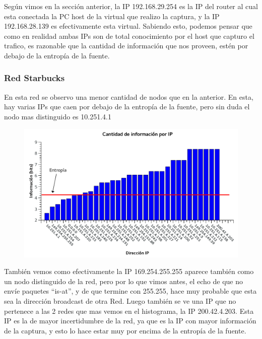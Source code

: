 Según vimos en la sección anterior, la IP 192.168.29.254 es la IP del router al cual esta conectada la PC host de la virtual que realizo la captura, y la IP 192.168.28.139 es efectivamente esta virtual. Sabiendo esto, podemos pensar que como en realidad ambas IPs son de total conocimiento por el host que capturo el trafico, es razonable que la cantidad de información que nos proveen, estén por debajo de la entropía de la fuente.

\FloatBarrier
\subsubsection{Red Starbucks}

En esta red se observo una menor cantidad de nodos que en la anterior. En esta, hay varias IPs que caen por debajo de la entropía de la fuente, pero sin duda el nodo mas distinguido es 10.251.4.1

\begin{figure}[h!]
  \begin{center}
    \includegraphics{graficos/informacion-starbucks.pdf}
	\caption{}
    \label{fig:info-starbucks}  
  \end{center}
\end{figure}

También vemos como efectivamente la IP 169.254.255.255 aparece también como un nodo distinguido de la red, pero por lo que vimos antes, el echo de que no envíe paquetes ``is-at'', y de que termine con 255.255, hace muy probable que esta sea la dirección broadcast de otra Red. Luego también se ve una IP que no pertenece a las 2 redes que mas vemos en el histograma, la IP 200.42.4.203. Esta IP es la de mayor incertidumbre de la red, ya que es la IP con mayor información de la captura, y esto lo hace estar muy por encima de la entropía de la fuente.


